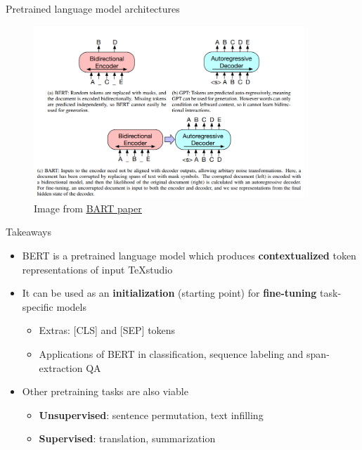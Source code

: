 \documentclass[12pt,aspectratio=169,handout]{beamer}
\begin{document}
\begin{frame}{Pretrained language model architectures}
	\begin{figure}[h]
		\includegraphics[height=6.5cm]{pretrained-lm-variants}
		\caption*{Image from \href{https://arxiv.org/pdf/1910.13461.pdf}{\underline{BART paper}}}
	\end{figure}
	
\end{frame}


\begin{frame}{Takeaways}
	
\begin{itemize}
	\item BERT is a pretrained language model which produces \textbf{contextualized} token representations of input TeXstudio
	\item It can be used as an \textbf{initialization} (starting point) for \textbf{fine-tuning} task-specific models
	\begin{itemize}
		\item Extras: [CLS] and [SEP] tokens
		\item Applications of BERT in classification, sequence labeling and span-extraction QA
	\end{itemize} 
	\item Other pretraining tasks are also viable
	\begin{itemize}
		\item \textbf{Unsupervised}: sentence permutation, text infilling
		\item \textbf{Supervised}: translation, summarization
	\end{itemize}
\end{itemize}
	
\end{frame}
\end{document}
